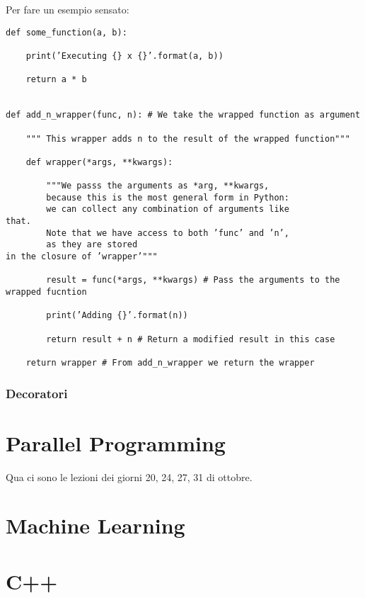 \documentclass[10pt, a4paper, titlepage]{book}
\begin{document}
Per fare un esempio sensato:
\begin{verbatim}
def some_function(a, b):

	print(’Executing {} x {}’.format(a, b))

	return a * b


def add_n_wrapper(func, n): # We take the wrapped function as argument

	""" This wrapper adds n to the result of the wrapped function"""

	def wrapper(*args, **kwargs):

		"""We passs the arguments as *arg, **kwargs, 
		because this is the most general form in Python:
		we can collect any combination of arguments like
that.
		Note that we have access to both ’func’ and ’n’,
		as they are stored
in the closure of ’wrapper’"""

		result = func(*args, **kwargs) # Pass the arguments to the wrapped fucntion

		print(’Adding {}’.format(n))

		return result + n # Return a modified result in this case

	return wrapper # From add_n_wrapper we return the wrapper
\end{verbatim}

\subsection{Decoratori}


\chapter{Parallel Programming}

Qua ci sono le lezioni dei giorni 20, 24, 27, 31 di ottobre.


\chapter{Machine Learning}


\chapter{C++}
\end{document}
